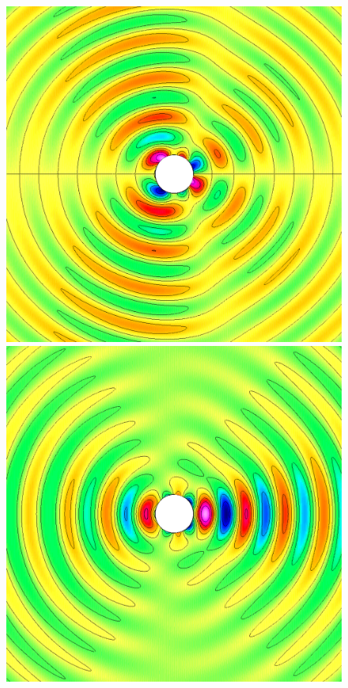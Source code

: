 \renewcommand{\figWidth}{.32\linewidth}
\begin{figure}
\begin{center}
\includegraphics[width=\figWidth]{figures/scatCyl-cibc2a-order4Ex}
\includegraphics[width=\figWidth]{figures/scatCyl-cibc2a-order4Ey}

\end{center}
\end{figure}

